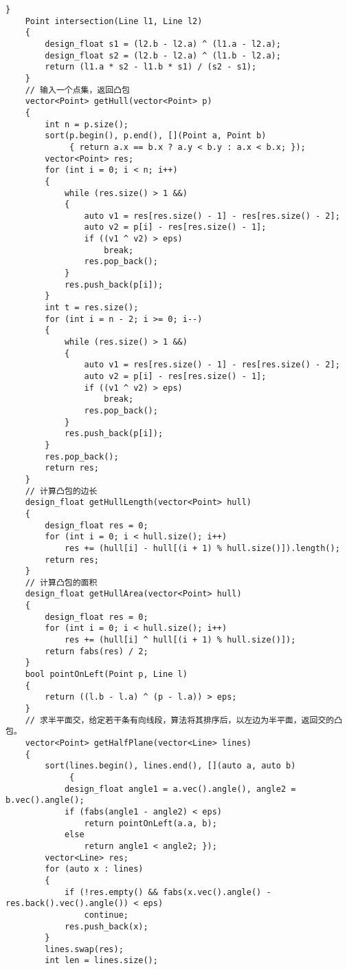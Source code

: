\documentclass{ctexbook}  %
\begin{document}
\begin{Verbatim}[fontsize=\small]
    }
    Point intersection(Line l1, Line l2)
    {
        design_float s1 = (l2.b - l2.a) ^ (l1.a - l2.a);
        design_float s2 = (l2.b - l2.a) ^ (l1.b - l2.a);
        return (l1.a * s2 - l1.b * s1) / (s2 - s1);
    }
    // 输入一个点集，返回凸包
    vector<Point> getHull(vector<Point> p)
    {
        int n = p.size();
        sort(p.begin(), p.end(), [](Point a, Point b)
             { return a.x == b.x ? a.y < b.y : a.x < b.x; });
        vector<Point> res;
        for (int i = 0; i < n; i++)
        {
            while (res.size() > 1 &&)
            {
                auto v1 = res[res.size() - 1] - res[res.size() - 2];
                auto v2 = p[i] - res[res.size() - 1];
                if ((v1 ^ v2) > eps)
                    break;
                res.pop_back();
            }
            res.push_back(p[i]);
        }
        int t = res.size();
        for (int i = n - 2; i >= 0; i--)
        {
            while (res.size() > 1 &&)
            {
                auto v1 = res[res.size() - 1] - res[res.size() - 2];
                auto v2 = p[i] - res[res.size() - 1];
                if ((v1 ^ v2) > eps)
                    break;
                res.pop_back();
            }
            res.push_back(p[i]);
        }
        res.pop_back();
        return res;
    }
    // 计算凸包的边长
    design_float getHullLength(vector<Point> hull)
    {
        design_float res = 0;
        for (int i = 0; i < hull.size(); i++)
            res += (hull[i] - hull[(i + 1) % hull.size()]).length();
        return res;
    }
    // 计算凸包的面积
    design_float getHullArea(vector<Point> hull)
    {
        design_float res = 0;
        for (int i = 0; i < hull.size(); i++)
            res += (hull[i] ^ hull[(i + 1) % hull.size()]);
        return fabs(res) / 2;
    }
    bool pointOnLeft(Point p, Line l)
    {
        return ((l.b - l.a) ^ (p - l.a)) > eps;
    }
    // 求半平面交，给定若干条有向线段，算法将其排序后，以左边为半平面，返回交的凸包。
    vector<Point> getHalfPlane(vector<Line> lines)
    {
        sort(lines.begin(), lines.end(), [](auto a, auto b)
             {
            design_float angle1 = a.vec().angle(), angle2 = b.vec().angle();
            if (fabs(angle1 - angle2) < eps)
                return pointOnLeft(a.a, b);
            else
                return angle1 < angle2; });
        vector<Line> res;
        for (auto x : lines)
        {
            if (!res.empty() && fabs(x.vec().angle() - res.back().vec().angle()) < eps)
                continue;
            res.push_back(x);
        }
        lines.swap(res);
        int len = lines.size();

\end{Verbatim}
\end{document}
